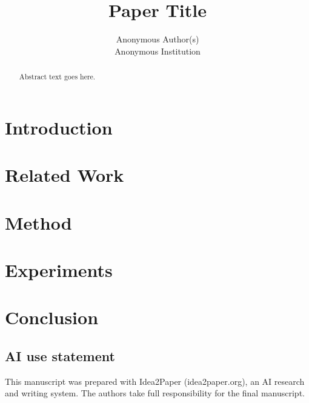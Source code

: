 \documentclass{article}
\title{Paper Title}
\author{Anonymous Author(s) \\
Anonymous Institution}
\begin{document}
\maketitle

\begin{abstract}
Abstract text goes here.
\end{abstract}

\section{Introduction}

\section{Related Work}

\section{Method}

\section{Experiments}

\section{Conclusion}

\subsection*{AI use statement}
This manuscript was prepared with Idea2Paper (idea2paper.org), an AI research and writing system. The authors take full responsibility for the final manuscript.



\end{document}
